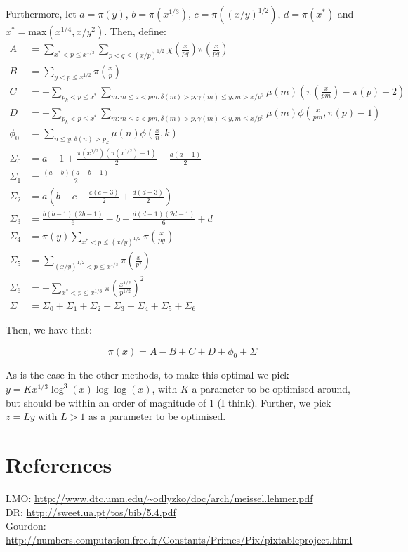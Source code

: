 \documentclass[12pt]{article}
\begin{document}
Furthermore, let $a=\pi\left(y\right)$, $b=\pi\left(x^{1/3}\right)$, $c=\pi\left((x/y)^{1/2}\right)$, $d=\pi\left(x^*\right)$
and $x^*=\mathrm{max}\left(x^{1/4}, x/y^2\right)$. Then, define:
\begin{align*}
  A &= \sum_{x^* < p \leq x^{1/3}}\sum_{p < q \leq (x/p)^{1/2}}\chi\left(\frac{x}{pq}\right)\pi\left(\frac{x}{pq}\right)\\
  B &= \sum_{y < p \leq x^{1/2}}\pi\left(\frac{x}{p}\right)\\
  C &= -\sum_{p_k < p \leq x^*} \sum_{m: m\leq z<pm,\delta(m)>p,\gamma(m)\leq y, m>x/p^3}\mu(m)\left(\pi\left(\frac{x}{pm}\right)-\pi(p)+2\right)\\
  D &= -\sum_{p_k < p \leq x^*} \sum_{m: m\leq z<pm,\delta(m)>p,\gamma(m)\leq y, m\leq x/p^3}\mu(m)\phi\left(\frac{x}{pm},\pi(p)-1\right)\\
  \phi_0 &= \sum_{n\leq y,\delta(n) >p_k}\mu(n)\phi\left(\frac{x}{n}, k\right)\\
  \Sigma_0 &= a - 1 + \frac{\pi\left(x^{1/2}\right)\left(\pi\left(x^{1/2}\right) - 1\right)}{2} - \frac{a(a-1)}{2}\\
  \Sigma_1 &= \frac{(a-b)(a-b-1)}{2}\\
  \Sigma_2 &= a\left(b - c - \frac{c(c-3)}{2} + \frac{d(d-3)}{2}\right)\\
  \Sigma_3 &= \frac{b(b-1)(2b-1)}{6} - b - \frac{d(d-1)(2d-1)}{6} + d\\
  \Sigma_4 &= \pi(y) \sum_{x^* < p \leq (x/y)^{1/2}}\pi\left(\frac{x}{py}\right)\\
  \Sigma_5 &= \sum_{(x/y)^{1/2} < p \leq x^{1/3}}\pi\left(\frac{x}{p^2}\right)\\
  \Sigma_6 &= -\sum_{x^* < p \leq x^{1/3}}\pi\left(\frac{x^{1/2}}{p^{1/2}}\right)^2\\
  \Sigma &= \Sigma_0 + \Sigma_1 + \Sigma_2 + \Sigma_3 + \Sigma_4 + \Sigma_5 + \Sigma_6
\end{align*}

Then, we have that:

\[
  \pi(x) = A - B + C + D + \phi_0 + \Sigma  
\]

As is the case in the other methods, to make this optimal we pick $y=Kx^{1/3}\log^3(x)\log\log(x)$, with $K$ a parameter to be optimised around,
but should be within an order of magnitude of 1 (I think). Further, we pick $z = Ly$ with $L>1$ as a parameter to be optimised.

\section{References}
LMO: \url{http://www.dtc.umn.edu/~odlyzko/doc/arch/meissel.lehmer.pdf} \\
DR: \url{http://sweet.ua.pt/tos/bib/5.4.pdf} \\
Gourdon: \url{http://numbers.computation.free.fr/Constants/Primes/Pix/pixtableproject.html}
\end{document}
